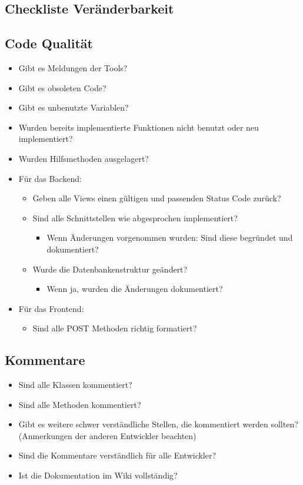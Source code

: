 \documentclass[accentcolor=tud0b,12pt,paper=a4]{tudreport}
\begin{document}
\subsection{Checkliste Veränderbarkeit}
\begin{multicols}{2}
	\renewcommand{\labelitemi}{\scriptsize$\square$}	\renewcommand{\labelitemii}{\scriptsize$\square$}
	\renewcommand{\labelitemiii}{\scriptsize$\square$}
	\subsection{Code Qualität}
	\begin{itemize}

		\item Gibt es Meldungen der Tools?
		\item Gibt es obsoleten Code?
		\item Gibt es unbenutzte Variablen?
		\item Wurden bereits implementierte Funktionen nicht benutzt oder neu implementiert?
		\item Wurden Hilfsmethoden ausgelagert?

		\item Für das Backend:
		\begin{itemize}
			\item Geben alle Views einen gültigen und passenden Status Code zurück?
			\item Sind alle Schnittstellen wie abgesprochen implementiert?
		\begin{itemize}
			\item Wenn Änderungen vorgenommen wurden: Sind diese begründet und dokumentiert?
		\end{itemize}
		\item Wurde die Datenbankenstruktur geändert?
			\begin{itemize}
				\item Wenn ja, wurden die Änderungen dokumentiert?
			\end{itemize}
		\end{itemize}
		\item Für das Frontend:
		\begin{itemize}
			\item Sind alle POST Methoden richtig formatiert?
		\end{itemize}
	\end{itemize}
	\subsection{Kommentare}
	\begin{itemize}
		\item Sind alle Klassen kommentiert?
		\item Sind alle Methoden kommentiert?
		\item Gibt es weitere schwer verständliche Stellen, die kommentiert werden sollten? (Anmerkungen der anderen Entwickler beachten)
		\item Sind die Kommentare verständlich für alle Entwickler?
		\item Ist die Dokumentation im Wiki vollständig?
	\end{itemize}


\end{multicols}
\end{document}
